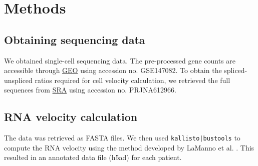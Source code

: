 \documentclass{article}
\begin{document}
\section{Methods}

\subsection{Obtaining sequencing data}

We obtained single-cell sequencing data. \cite{olalekan2021characterizing} The
pre-processed gene counts are accessible through
\href{https://www.ncbi.nlm.nih.gov/geo}{GEO} using accession no. GSE147082. To
obtain the spliced-unspliced ratios required for cell velocity calculation, we
retrieved the full sequences from
\href{https://www.ncbi.nlm.nih.gov/Traces/study}{SRA} using accession no.
PRJNA612966.

\subsection{RNA velocity calculation}

The data was retrieved as FASTA files. We then used \texttt{kallisto|bustools}
to compute the RNA velocity using the method developed by LaManno et al.
\cite{kallisto,la2018rna}. This resulted in an annotated data file (h5ad) for
each patient.



\end{document}
